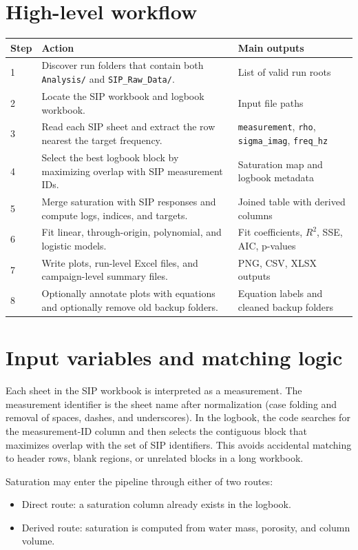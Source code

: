 \documentclass[11pt]{article}
\begin{document}
\section{High-level workflow}
\begin{longtable}{p{} p{} p{}}
\toprule
\textbf{Step} & \textbf{Action} & \textbf{Main outputs}\\
\midrule
\endhead
1 & Discover run folders that contain both \texttt{Analysis/} and \texttt{SIP\_Raw\_Data/}. & List of valid run roots\\
2 & Locate the SIP workbook and logbook workbook. & Input file paths\\
3 & Read each SIP sheet and extract the row nearest the target frequency. & \texttt{measurement}, \texttt{rho}, \texttt{sigma\_imag}, \texttt{freq\_hz}\\
4 & Select the best logbook block by maximizing overlap with SIP measurement IDs. & Saturation map and logbook metadata\\
5 & Merge saturation with SIP responses and compute logs, indices, and targets. & Joined table with derived columns\\
6 & Fit linear, through-origin, polynomial, and logistic models. & Fit coefficients, $R^2$, SSE, AIC, p-values\\
7 & Write plots, run-level Excel files, and campaign-level summary files. & PNG, CSV, XLSX outputs\\
8 & Optionally annotate plots with equations and optionally remove old backup folders. & Equation labels and cleaned backup folders\\
\bottomrule
\end{longtable}

\section{Input variables and matching logic}
Each sheet in the SIP workbook is interpreted as a measurement. The measurement identifier is the sheet name after normalization (case folding and removal of spaces, dashes, and underscores). In the logbook, the code searches for the measurement-ID column and then selects the contiguous block that maximizes overlap with the set of SIP identifiers. This avoids accidental matching to header rows, blank regions, or unrelated blocks in a long workbook.

Saturation may enter the pipeline through either of two routes:
\begin{itemize}[leftmargin=1.5em]
\item Direct route: a saturation column already exists in the logbook.
\item Derived route: saturation is computed from water mass, porosity, and column volume.
\end{itemize}
\end{document}
